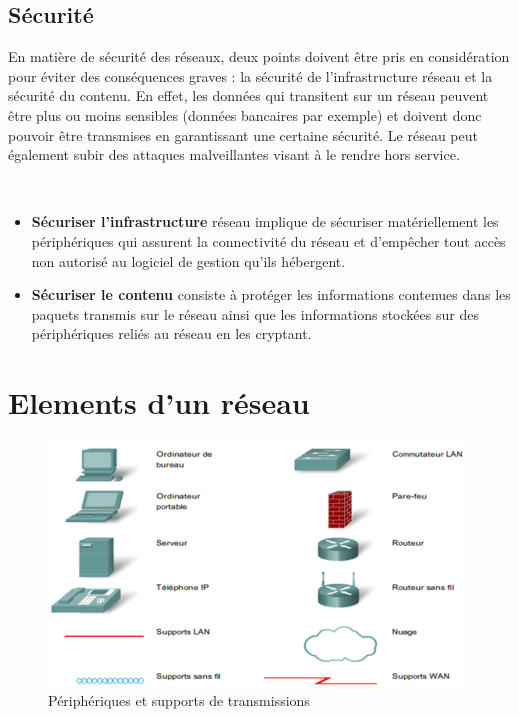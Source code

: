 \documentclass[10pt,fleqn]{article} %
\begin{document}
\subsection{Sécurité}
En matière de sécurité des réseaux, deux points doivent être pris en considération pour éviter des conséquences graves : la sécurité de l'infrastructure réseau et la sécurité du contenu.
En effet, les données qui transitent sur un réseau peuvent être plus ou moins sensibles (données bancaires par exemple) et doivent donc pouvoir être transmises en garantissant une certaine sécurité.
Le réseau peut également subir des attaques malveillantes visant à le rendre hors service.
\begin{aretenir}~
  \begin{itemize}
    \item \textbf{Sécuriser l'infrastructure} réseau implique de sécuriser matériellement les périphériques qui assurent la connectivité du réseau et d'empêcher tout accès non autorisé au logiciel de gestion qu'ils hébergent.
    \item \textbf{Sécuriser le contenu} consiste à protéger les informations contenues dans les paquets transmis sur le réseau ainsi que les informations stockées sur des périphériques reliés au réseau en les cryptant.
  \end{itemize}
\end{aretenir}
\section{Elements d'un réseau}
\begin{figure}[h]
  \centering
  \includegraphics[height=.3\textheight]{img/reseau_peripheriques}
  \caption{Périphériques et supports de transmissions}
\end{figure}
\end{document}
